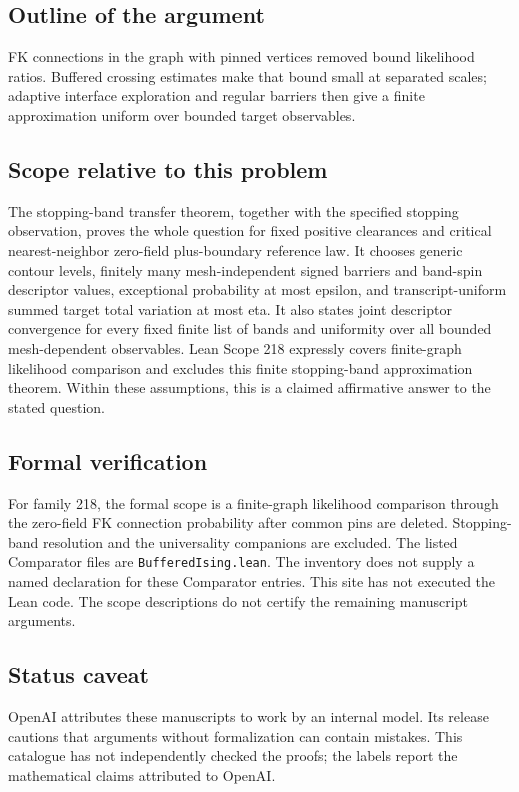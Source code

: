 \documentclass[11pt]{article}
\begin{document}
\subsection{Outline of the argument}
FK connections in the graph with pinned vertices removed bound likelihood ratios. Buffered crossing estimates make that bound small at separated scales; adaptive interface exploration and regular barriers then give a finite approximation uniform over bounded target observables.

\subsection{Scope relative to this problem}
The stopping-band transfer theorem, together with the specified stopping observation, proves the whole question for fixed positive clearances and critical nearest-neighbor zero-field plus-boundary reference law. It chooses generic contour levels, finitely many mesh-independent signed barriers and band-spin descriptor values, exceptional probability at most epsilon, and transcript-uniform summed target total variation at most eta. It also states joint descriptor convergence for every fixed finite list of bands and uniformity over all bounded mesh-dependent observables. Lean Scope 218 expressly covers finite-graph likelihood comparison and excludes this finite stopping-band approximation theorem. Within these assumptions, this is a claimed affirmative answer to the stated question.

\subsection{Formal verification}
For family 218, the formal scope is a finite-graph likelihood comparison through the zero-field FK connection probability after common pins are deleted. Stopping-band resolution and the universality companions are excluded. The listed Comparator files are \texttt{BufferedIsing.lean}. The inventory does not supply a named declaration for these Comparator entries. This site has not executed the Lean code. The scope descriptions do not certify the remaining manuscript arguments.

\subsection{Status caveat}
OpenAI attributes these manuscripts to work by an internal model. Its release cautions that arguments without formalization can contain mistakes. This catalogue has not independently checked the proofs; the labels report the mathematical claims attributed to OpenAI.
\end{document}

